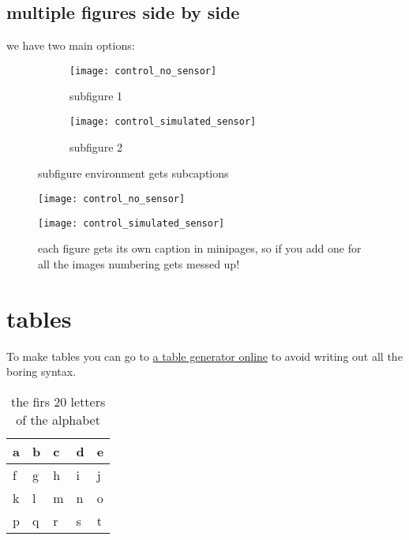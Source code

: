 \documentclass[../thesis.tex]{subfiles}
\begin{document}
\subsection{multiple figures side by side}
we have two main options: 
\begin{figure}
    \centering
    \begin{subfigure}[b]{0.49\textwidth}
        \centering
        \texttt{[image: control\_no\_sensor]}
        \caption{subfigure 1}\label{fig:subfig1}
    \end{subfigure}
    \begin{subfigure}[b]{0.49\textwidth}
        \centering
        \texttt{[image: control\_simulated\_sensor]}
        \caption{subfigure 2}\label{fig:subfig2}
    \end{subfigure}
    \caption{subfigure environment gets subcaptions}
\end{figure}


\begin{figure}
\centering
\begin{minipage}{.5\textwidth}
  \centering
  \texttt{[image: control\_no\_sensor]}
  \label{fig:mini1}
\end{minipage}%
\begin{minipage}{.5\textwidth}
  \centering
  \texttt{[image: control\_simulated\_sensor]}
  \label{fig:mini2}
\end{minipage}
\caption{each figure gets its own caption in minipages, so if you add one for all the images numbering gets messed up!}
\end{figure}


\section{tables}
To make tables you can go to \href{https://www.tablesgenerator.com/}{a table generator online} to avoid writing out all the boring syntax. 
\begin{table}[h]
\centering
\begin{tabular}{|l|l|l|l|l|}
\hline
a & b & c & d & e \\ \hline
f & g & h & i & j \\ \hline
k & l & m & n & o \\ \hline
p & q & r & s & t \\ \hline
\end{tabular}
\caption{the firs 20 letters of the alphabet}
\label{tab:table}
\end{table}
\end{document}
